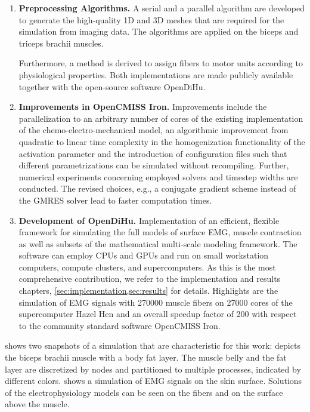 \begin{enumerate}[label=(\roman*)]
\item \textbf{Preprocessing Algorithms.} 
A serial and a parallel algorithm are developed to generate the high-quality 1D and 3D meshes that are required for the simulation from imaging data. The algorithms are applied on the biceps and triceps brachii muscles.

Furthermore, a method is derived to assign fibers to motor units according to physiological properties. Both implementations are made publicly available together with the open-source software OpenDiHu.
\item \textbf{Improvements in OpenCMISS Iron.} Improvements include the parallelization to an arbitrary number of cores of the existing implementation of the chemo-electro-mechanical model, an algorithmic improvement from quadratic to linear time complexity in the homogenization functionality of the activation parameter and the introduction of configuration files such that different parametrizations can be simulated without recompiling. Further, numerical experiments concerning employed solvers and timestep widths are conducted. The revised choices, e.g., a conjugate gradient scheme instead of the GMRES solver lead to faster computation times.
\item \textbf{Development of OpenDiHu.} Implementation of an efficient, flexible framework for simulating the full models of surface EMG, muscle contraction as well as subsets of the mathematical multi-scale modeling framework. The software can employ CPUs and GPUs and run on small workstation computers, compute clusters, and supercomputers.
As this is the most comprehensive contribution, we refer to the implementation and results chapters, \cref{sec:implementation,sec:results} for details.
Highlights are the simulation of EMG signals with \num{270000} muscle fibers on \num{27000} cores of the supercomputer Hazel Hen and an overall speedup factor of 200 with respect to the community standard software OpenCMISS Iron.
\end{enumerate}

 shows two snapshots of a simulation that are characteristic for this work:  depicts the biceps brachii muscle with a body fat layer. The muscle belly and the fat layer are discretized by nodes and partitioned to multiple processes, indicated by different colors.
 shows a simulation of EMG signals on the skin surface. Solutions of the electrophysiology models can be seen on the fibers and on the surface above the muscle.

